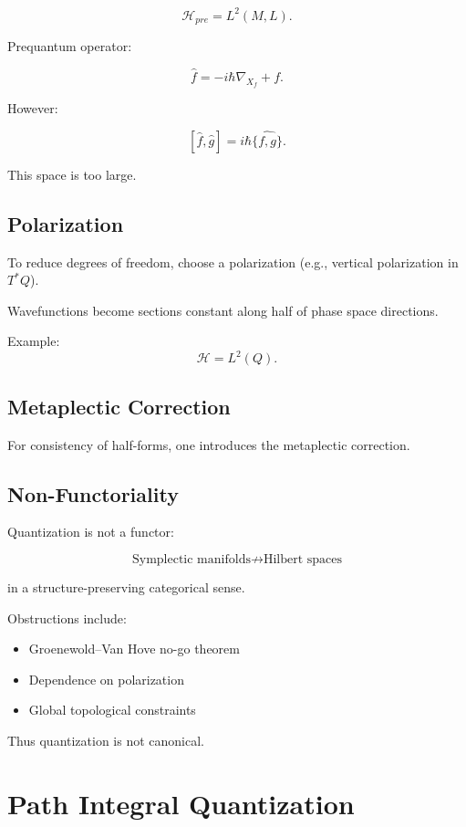 \[
\mathcal H_{pre} = L^2(M,L).
\]

Prequantum operator:

\[
\hat f = -i\hbar \nabla_{X_f} + f.
\]

However:

\[
[\hat f, \hat g] = i\hbar \widehat{\{f,g\}}.
\]

This space is too large.

\subsection{Polarization}

To reduce degrees of freedom, choose a polarization 
(e.g., vertical polarization in $T^*Q$). 

Wavefunctions become sections constant along half of phase space directions.

Example:
\[
\mathcal H = L^2(Q).
\]

\subsection{Metaplectic Correction}

For consistency of half-forms, one introduces the metaplectic correction.

\subsection{Non-Functoriality}

Quantization is not a functor:

\[
\text{Symplectic manifolds}
\not\longrightarrow
\text{Hilbert spaces}
\]

in a structure-preserving categorical sense.

Obstructions include:

\begin{itemize}
\item Groenewold–Van Hove no-go theorem
\item Dependence on polarization
\item Global topological constraints
\end{itemize}

Thus quantization is not canonical.

\section{Path Integral Quantization}

